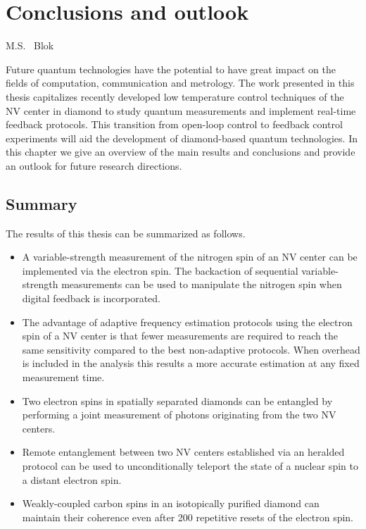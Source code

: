\graphicspath{{./ch_conclusion_and_outlook/figures/}}

\chapter{Conclusions and outlook}
\label{ch:conclusion}

\begin{center} 
    \vspace{-1cm} {M.S. ~Blok} 
\end{center}

Future quantum technologies have the potential to have great impact on the fields of computation, communication and metrology. The work presented in this thesis capitalizes recently developed low temperature control techniques of the NV center in diamond to study quantum measurements and implement real-time feedback protocols. This transition from open-loop control to feedback control experiments will aid the development of diamond-based quantum technologies. In this chapter we give an overview of the main results and conclusions and provide an outlook for future research directions.
\clearpage

\section{Summary}
The results of this thesis can be summarized as follows.
\begin{itemize}

  \item A variable-strength measurement of the nitrogen spin of an NV center can be implemented via the electron spin. The backaction of sequential variable-strength measurements can be used to manipulate the nitrogen spin when digital feedback is incorporated.

  \item The advantage of adaptive frequency estimation protocols using the electron spin of a NV center is that fewer measurements are required to reach the same sensitivity compared to the best non-adaptive protocols. When overhead is included in the analysis this results a more accurate estimation at any fixed measurement time.

  \item Two electron spins in spatially separated diamonds can be entangled by performing a joint measurement of photons originating from the two NV centers. 

  \item Remote entanglement between two NV centers established via an heralded protocol can be used to unconditionally teleport the state of a nuclear spin to a distant electron spin.

  \item Weakly-coupled carbon spins in an isotopically purified diamond can maintain their coherence even after 200 repetitive resets of the electron spin.
  
\end{itemize}

